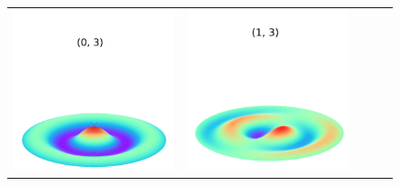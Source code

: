 \documentclass[a4paper]{ctexart}
\begin{document}
\begin{figure}[htbp]
\begin{tabular}{ccccc}
			\includegraphics[scale=0.4]{0_3.png} & \includegraphics[scale=0.4]{1_3.png}

\end{tabular}
\end{figure}
\end{document}
